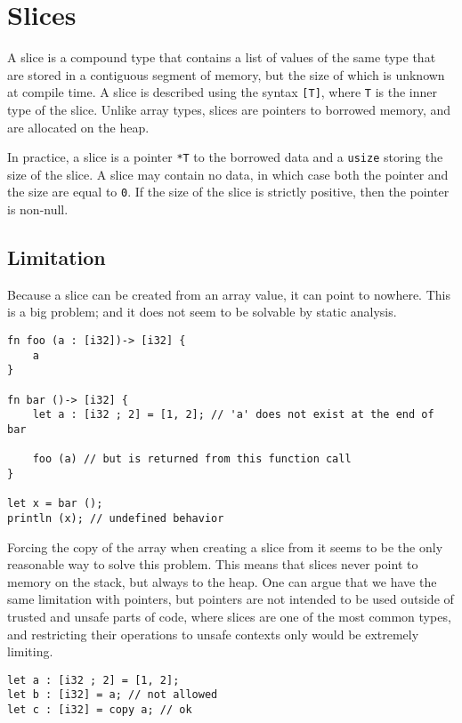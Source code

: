 \section{Slices}%
\label{sec:slices}

A slice is a compound type that contains a list of values of the same type that
are stored in a contiguous segment of memory, but the size of which is unknown
at compile time. A slice is described using the syntax \texttt{[T]}, where
\texttt{T} is the inner type of the slice. Unlike array types, slices are
pointers to borrowed memory, and are allocated on the heap.

In practice, a slice is a pointer \texttt{*T} to the borrowed data and a
\texttt{usize} storing the size of the slice. A slice may contain no data, in
which case both the pointer and the size are equal to \texttt{0}. If the size of
the slice is strictly positive, then the pointer is non-null.

\subsection{Limitation}%
\label{sec:slice_lim}

Because a slice can be created from an array value, it can point to nowhere.
This is a big problem; and it does not seem to be solvable by static analysis.

\begin{lstlisting}[style=coloredverbatim]
fn foo (a : [i32])-> [i32] {
    a
}

fn bar ()-> [i32] {
    let a : [i32 ; 2] = [1, 2]; // 'a' does not exist at the end of bar

    foo (a) // but is returned from this function call
}

let x = bar ();
println (x); // undefined behavior
\end{lstlisting}

Forcing the copy of the array when creating a slice from it seems to be the only
reasonable way to solve this problem. This means that slices never point to
memory on the stack, but always to the heap. One can argue that we have the same
limitation with pointers, but pointers are not intended to be used outside of
trusted and unsafe parts of code, where slices are one of the most common types,
and restricting their operations to unsafe contexts only would be extremely
limiting.

\begin{lstlisting}[style=coloredverbatim]
let a : [i32 ; 2] = [1, 2];
let b : [i32] = a; // not allowed
let c : [i32] = copy a; // ok
\end{lstlisting}

